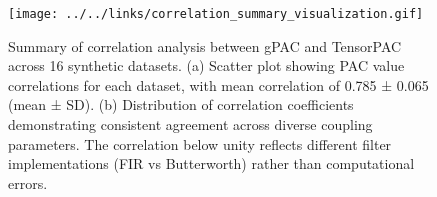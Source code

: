 \begin{figure}[htbp]
\centering
\texttt{[image: ../../links/correlation\_summary\_visualization.gif]}
\caption{Summary of correlation analysis between gPAC and TensorPAC across 16 synthetic datasets. 
(a) Scatter plot showing PAC value correlations for each dataset, with mean correlation of 0.785 ± 0.065 (mean ± SD). 
(b) Distribution of correlation coefficients demonstrating consistent agreement across diverse coupling parameters. 
The correlation below unity reflects different filter implementations (FIR vs Butterworth) rather than computational errors.}
\label{fig:correlation_summary}
\end{figure}